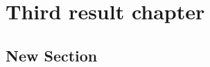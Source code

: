 
\chapter[Third result chapter]{Third result chapter} \label{concl}
\label{chap4}

\section{New Section}
